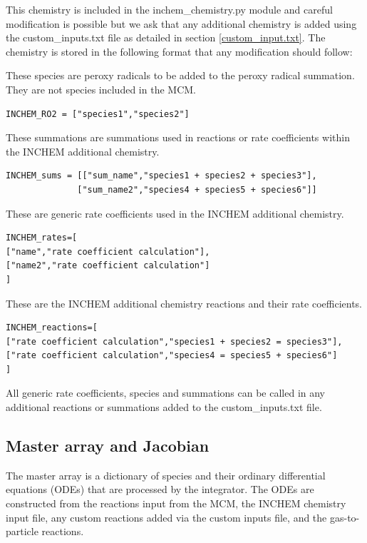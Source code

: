 \documentclass[a4paper]{refart}
\begin{document}
This chemistry is included in the inchem\_chemistry.py module and careful modification is possible but we ask that any additional chemistry is added using the custom\_inputs.txt file as detailed in section \ref{custom_input.txt}. The chemistry is stored in the following format that any modification should follow:

These species are peroxy radicals to be added to the peroxy radical summation. They are not species included in the MCM.
\begin{verbatim}
INCHEM_RO2 = ["species1","species2"]
\end{verbatim}

These summations are summations used in reactions or rate coefficients within the INCHEM additional chemistry.
\begin{verbatim}
INCHEM_sums = [["sum_name","species1 + species2 + species3"],
              ["sum_name2","species4 + species5 + species6"]]
\end{verbatim}

These are generic rate coefficients used in the INCHEM additional chemistry.
\begin{verbatim}
INCHEM_rates=[
["name","rate coefficient calculation"],
["name2","rate coefficient calculation"]
]
\end{verbatim}

These are the INCHEM additional chemistry reactions and their rate coefficients.
\begin{verbatim}
INCHEM_reactions=[
["rate coefficient calculation","species1 + species2 = species3"],
["rate coefficient calculation","species4 = species5 + species6"]
]
\end{verbatim}

All generic rate coefficients, species and summations can be called in any additional reactions or summations added to the custom\_inputs.txt file.

\subsection{Master array and Jacobian}
The master array is a dictionary of species and their ordinary differential equations (ODEs) that are processed by the integrator. The ODEs are constructed from the reactions input from the MCM, the INCHEM chemistry input file, any custom reactions added via the custom inputs file, and the gas-to-particle reactions.
\end{document}
